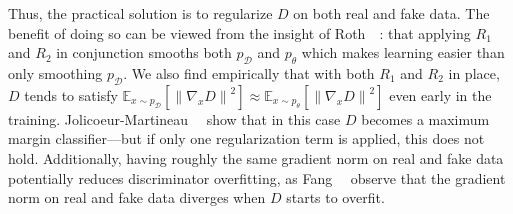 Thus, the practical solution is to regularize $D$ on both real and fake data. The benefit of doing so can be viewed from the insight of Roth~\etal~\cite{r1r2}: that applying $R_1$ and $R_2$ in conjunction smooths both $p_\mathcal{D}$ and $p_\theta$ which makes learning easier than only smoothing $p_\mathcal{D}$. We also find empirically that with both $R_1$ and $R_2$ in place, $D$ tends to satisfy $\mathbb{E}_{x\sim p_\mathcal{D}}\left[\left\| \nabla_x D \right \|^2\right]\approx\mathbb{E}_{x\sim p_\theta}\left[\left\| \nabla_x D \right \|^2\right]$ even early in the training. Jolicoeur-Martineau~\etal~\cite{ganmmc} show that in this case $D$ becomes a maximum margin classifier---but if only one regularization term is applied, this does not hold. Additionally, having roughly the same gradient norm on real and fake data potentially reduces discriminator overfitting, as Fang~\etal~\cite{diggan} observe that the gradient norm on real and fake data diverges when $D$ starts to overfit.

